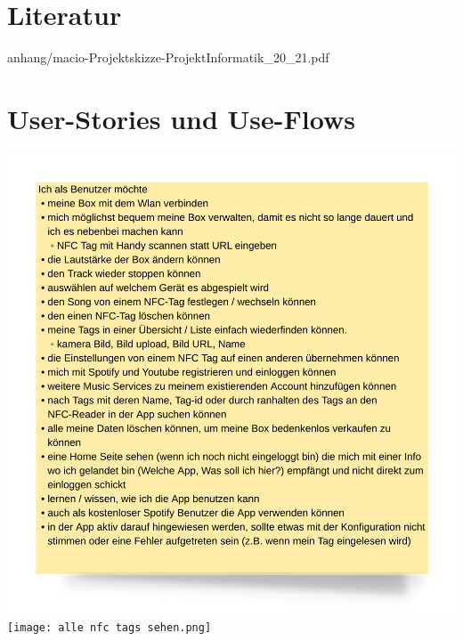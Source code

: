 \documentclass[10pt, a4paper]{article}
\begin{document}
\begin{onehalfspace}
\end{onehalfspace}
\newpage
\appendix
\section{Literatur}
  \printbibliography[title={~}]


    {anhang/macio-Projektskizze-ProjektInformatik_20_21.pdf}

\section{User-Stories und Use-Flows}
  \label{FlowCharts}
  \label{anhang:lucidchart}
  \includegraphics[width=\textwidth]{user stories.png}
  \newpage
  \texttt{[image: alle nfc tags sehen.png]}
\end{document}

